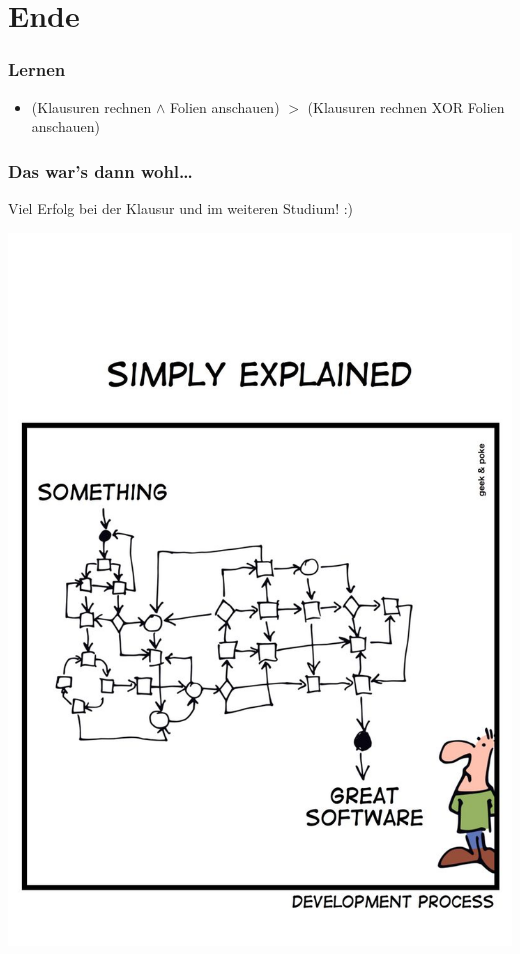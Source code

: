 \documentclass[18pt]{beamer}
\begin{document}
\section{Ende}
	\begin{frame}
		\frametitle{Lernen}
		\begin{itemize}
			\item (Klausuren rechnen $\land$ Folien anschauen) \linebreak $>$ (Klausuren rechnen XOR Folien anschauen)
		\end{itemize}
	\end{frame}

	\begin{frame}
		\frametitle{Das war's dann wohl\dots}
		\centering
		\begin{large}
			Viel Erfolg bei der Klausur und im weiteren Studium! :)
		\end{large}
		\linebreak
		\includegraphics[scale=0.75]{./comics/geek_and_poke_development2.jpg}
	\end{frame}
\end{document}
